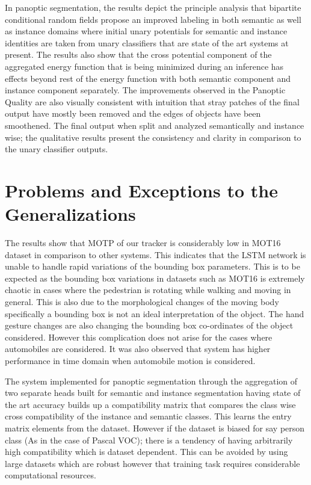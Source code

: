 In panoptic segmentation, the results depict the principle analysis that bipartite conditional random fields propose an improved labeling in both semantic as well as instance domains where initial unary potentials for semantic and instance identities are taken from unary classifiers that are state of the art systems at present. The results also show that the cross potential component of the aggregated energy function that is being minimized during an inference has effects beyond rest of the energy function with both semantic component and instance component separately. The improvements observed in the Panoptic Quality are also visually consistent with intuition that stray patches of the final output have mostly been removed and the edges of objects have been smoothened. The final output when split and analyzed semantically and instance wise; the qualitative results present the consistency and clarity in comparison to the unary classifier outputs.


\section{Problems and Exceptions to the Generalizations}
The results show that MOTP of our tracker is considerably low in MOT16 dataset in comparison to other systems. This indicates that the LSTM network is unable to handle rapid variations of the bounding box parameters. This is to be expected as the bounding box variations in datasets such as MOT16 is extremely chaotic in cases where the pedestrian is rotating while walking and moving in general. This is also due to the morphological changes of the moving body specifically a bounding box is not an ideal interpretation of the object. The hand gesture changes are also changing the bounding box co-ordinates of the object considered. However this complication does not arise for the cases where automobiles are considered. It was also observed that system has higher performance in time domain when automobile motion is considered.

The system implemented for panoptic segmentation through the aggregation of two separate heads built for semantic and instance segmentation having state of the art accuracy builds up a compatibility matrix that compares the class wise cross compatibility of the instance and semantic classes. This learns the entry matrix elements from the dataset. However if the dataset is biased for say person class (As in the case of Pascal VOC); there is a tendency of having arbitrarily high compatibility which is dataset dependent. This can be avoided by using large datasets which are robust however that training task requires considerable computational resources. 



